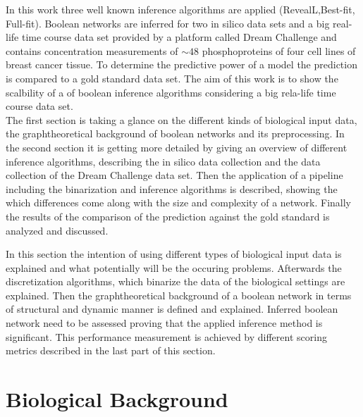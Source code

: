 In this work three well known inference algorithms are applied (RevealL,Best-fit, Full-fit).
\citep{10.1371/journal.pone.0171097}
Boolean networks are inferred for two in silico data sets and a big real-life time course data set provided by a platform called Dream Challenge and contains concentration measurements of $\sim 48$ phosphoproteins of four cell lines of breast cancer tissue. To determine the predictive power of a model the prediction is compared to a gold standard data set. The aim of this work is to show the scalbility of a of boolean inference algorithms considering a big rela-life time course data set.
\\
The first section is taking a glance on the different kinds of biological input data, the graphtheoretical background of boolean networks and its preprocessing.
In the second section it is getting more detailed by giving an overview of different inference algorithms, describing the in silico data collection and the data collection of the Dream Challenge data set. Then the application of a pipeline including the binarization and inference algorithms is described, showing the which differences come along with the size and complexity of a network. Finally the results of the comparison of the prediction against the gold standard is analyzed and discussed.

In this section the intention of using different types of biological input data is explained and what potentially will be the occuring problems. Afterwards the discretization algorithms, which binarize the data of the biological settings are explained. Then the graphtheoretical background of a boolean network in terms of structural and dynamic manner is defined and explained. Inferred boolean network need to be assessed proving that the applied inference method is significant. This performance measurement is achieved by different scoring metrics described in the last part of this section.


\section{Biological Background}

